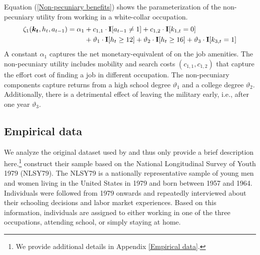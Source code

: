 \noindent Equation (\ref{Non-pecuniary benefits}) shows the parameterization of the non-pecuniary utility from working in a white-collar occupation.
%
\begin{align}\label{Non-pecuniary benefits}
\zeta_{1}(\bm{k_t}, h_t, a_{t-1})  = \alpha_1  &+ c_{1,1} \cdot {\textbf{I}}[a_{t-1} \neq 1] + c_{1,2} \cdot {\textbf{I}}[k_{1,t} = 0] \\ \nonumber
                            & + \vartheta_1 \cdot {\textbf{I}}[h_t \geq 12] + \vartheta_2 \cdot {\textbf{I}}[h_t \geq 16] + \vartheta_3 \cdot {\textbf{I}}[k_{3,t} = 1]
\end{align}
%
A constant $\alpha_1$ captures the net monetary-equivalent of on the job amenities. The non-pecuniary utility includes mobility and search costs $(c_{1,1}, c_{1,2})$ that capture the effort cost of finding a job in different occupation. The non-pecuniary components capture returns from a high school degree $\vartheta_1$ and a college degree $\vartheta_2$. Additionally, there is a detrimental effect of leaving the military early, i.e., after one year $\vartheta_3$.
\subsection{Empirical data}
We analyze the original dataset used by \citet{Keane.1997} and thus only provide a brief description here.\footnote{We provide additional details in Appendix \ref{Empirical data}.} \citet{Keane.1997} construct their sample based on the National Longitudinal Survey of Youth 1979 (NLSY79). The NLSY79 is a nationally representative sample of young men and women living in the United States in 1979 and born between 1957 and 1964. Individuals were followed from 1979 onwards and repeatedly interviewed about their schooling decisions and labor market experiences. Based on this information, individuals are assigned to either working in one of the three occupations, attending school, or simply staying at home.\\

